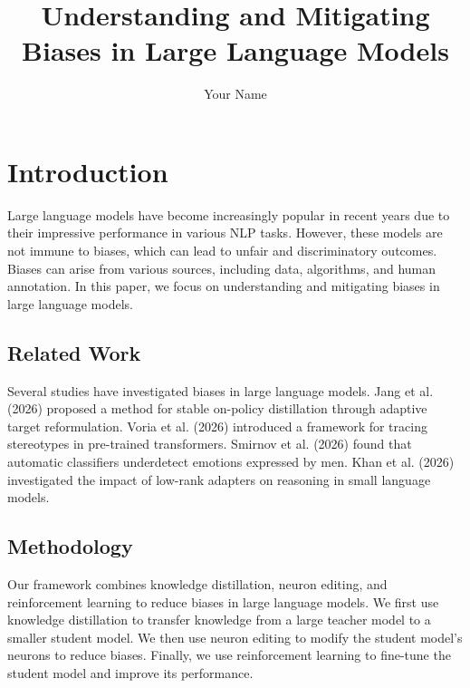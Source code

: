 \documentclass{article}
\begin{document}
\title{Understanding and Mitigating Biases in Large Language Models}

\author{Your Name}

\maketitle


\section{Introduction}

Large language models have become increasingly popular in recent years due to their impressive performance in various NLP tasks. However, these models are not immune to biases, which can lead to unfair and discriminatory outcomes. Biases can arise from various sources, including data, algorithms, and human annotation. In this paper, we focus on understanding and mitigating biases in large language models.

\subsection{Related Work}

Several studies have investigated biases in large language models. Jang et al. (2026) proposed a method for stable on-policy distillation through adaptive target reformulation. Voria et al. (2026) introduced a framework for tracing stereotypes in pre-trained transformers. Smirnov et al. (2026) found that automatic classifiers underdetect emotions expressed by men. Khan et al. (2026) investigated the impact of low-rank adapters on reasoning in small language models.

\subsection{Methodology}

Our framework combines knowledge distillation, neuron editing, and reinforcement learning to reduce biases in large language models. We first use knowledge distillation to transfer knowledge from a large teacher model to a smaller student model. We then use neuron editing to modify the student model's neurons to reduce biases. Finally, we use reinforcement learning to fine-tune the student model and improve its performance.
\end{document}
